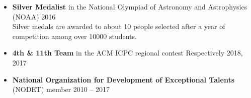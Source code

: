 \documentclass[a4paper,10pt]{article}
\makeatletter
\newcommand{\resumeSubheading}[4]{
  \item
    \begin{tabular*}{0.98\textwidth}[t]{l@{\extracolsep{\fill}}r}
      \textbf{#1} & #2 \\
      #3 & #4 \\
    \end{tabular*}
}
\newcommand{\resumeSubHeadingListStart}{\begin{itemize}[leftmargin=*]}
\newcommand{\resumeSubHeadingListEnd}{\end{itemize}}
\newcommand{\resumeItemListStart}{\begin{itemize}\vspace{-4pt}}
\newcommand{\resumeItemListEnd}{\end{itemize}}
\makeatother
\begin{document}
\resumeSubHeadingListStart


\item \textbf{Silver Medalist} in the  National Olympiad of Astronomy and Astrophysics (NOAA) \hfill 2016
\\
 \small
  Silver medals are awarded to about 10 people selected after a year of competition among over 10000 students.
  \normalsize

\item \textbf{4th \& 11th Team} in the ACM ICPC regional contest \hfill Respectively 2018, 2017

  
  
  \item \textbf{National Organization for Development of Exceptional Talents} (NODET) member \hfill  2010 – 2017

  \resumeSubHeadingListEnd
      


\end{document}
